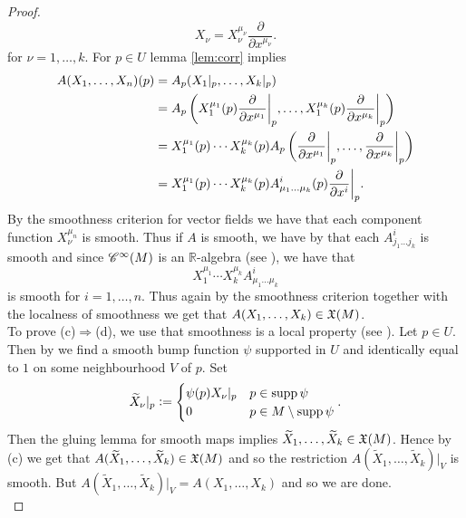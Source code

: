 \begin{appendix}
\begin{proof}
\begin{equation*}
X_\nu = X^{\mu_\nu}_\nu \frac{\partial}{\partial x^{\mu_\nu}}.
\end{equation*}
\noindent for $\nu = 1,\dots,k$. For $p \in U$ lemma \ref{lem:corr} implies
\begin{align*}
A(X_1,\dots,X_n)(p) &= A_p(X_1\vert_p,\dots,X_k\vert_p)\\
&= A_p\del[3]{X^{\mu_1}_1(p) \frac{\partial}{\partial x^{\mu_1}}\bigg\vert_p,\dots,X^{\mu_k}_1(p) \frac{\partial}{\partial x^{\mu_k}}\bigg\vert_p}\\
&= X^{\mu_1}_1(p) \cdots X^{\mu_k}_k(p)A_p\del[3]{\frac{\partial}{\partial x^{\mu_1}}\bigg\vert_p,\dots,\frac{\partial}{\partial x^{\mu_k}}\bigg\vert_p}\\
&= X^{\mu_1}_1(p) \cdots X^{\mu_k}_k(p) A^i_{\mu_1 \dots \mu_k}(p)\frac{\partial}{\partial x^i}\bigg\vert_p.
\end{align*}
By the smoothness criterion for vector fields \cite[175]{lee:smooth_manifolds:2013} we have that each component function $X^{\mu_n}_\nu$ is smooth. Thus if $A$ is smooth, we have by  that each $A^i_{j_1\dots j_k}$ is smooth and since $\mathscr{C}^\infty(M)$ is an $\mathbb{R}$-algebra (see \cite[33]{lee:smooth_manifolds:2013}), we have that 
\begin{equation*}
X^{\mu_1}_1 \cdots X^{\mu_k}_k A^i_{\mu_1 \dots \mu_k}
\end{equation*} 
\noindent is smooth for $i = 1,\dots,n$. Thus again by the smoothness criterion together with the localness of smoothness \cite[35]{lee:smooth_manifolds:2013} we get that $A(X_1,\dots,X_k) \in \mathfrak{X}(M)$.\\
To prove (c)$\Rightarrow$(d), we use that smoothness is a local property (see \cite[35]{lee:smooth_manifolds:2013}). Let $p \in U$.  Then by \cite[14]{cattaneo:manifolds:2017} we find a smooth bump function $\psi$ supported in $U$ and identically equal to $1$ on some neighbourhood $V$ of $p$. Set 
\begin{align*}
\widetilde{X}_\nu\vert_p := \begin{cases}
\psi(p) X_\nu\vert_p & p \in \operatorname{supp} \psi\\
0 & p \in M \setminus \operatorname{supp} \psi
\end{cases}.
\end{align*}
Then the gluing lemma for smooth maps \cite[35]{lee:smooth_manifolds:2013} implies $\widetilde{X}_1,\dots,\widetilde{X}_k \in \mathfrak{X}(M)$. Hence by (c) we get that $A(\widetilde{X}_1,\dots,\widetilde{X}_k) \in \mathfrak{X}(M)$ and so the restriction $A(\widetilde{X}_1,\dots,\widetilde{X}_k)\vert_V$ is smooth. But $A(\widetilde{X}_1,\dots,\widetilde{X}_k)\vert_V = A(X_1,\dots,X_k)$ and so we are done.\\

\end{proof}
\end{appendix}
